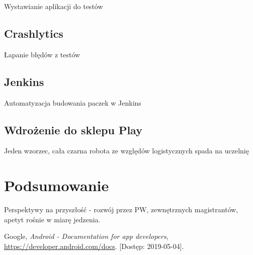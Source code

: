 \documentclass{pracamgr}
\begin{document}
Wystawianie aplikacji do testów

\section{Crashlytics}

Łapanie błędów z testów

\section{Jenkins}

Automatyzacja budowania paczek w Jenkins

\section{Wdrożenie do sklepu Play}

Jeden wzorzec, cała czarna robota ze względów logistycznych spada na uczelnię

\chapter{Podsumowanie}

Perspektywy na przyszłość - rozwój przez PW, zewnętrznych magistrantów, apetyt rośnie w miarę jedzenia.

\appendix

\newpage
\listoffigures


\begin{thebibliography}{99}


 Google, \textit{Android - Documentation for app developers},
	 \url{https://developer.android.com/docs}. [Dostęp: 2019-05-04].

\end{thebibliography}
\end{document}

